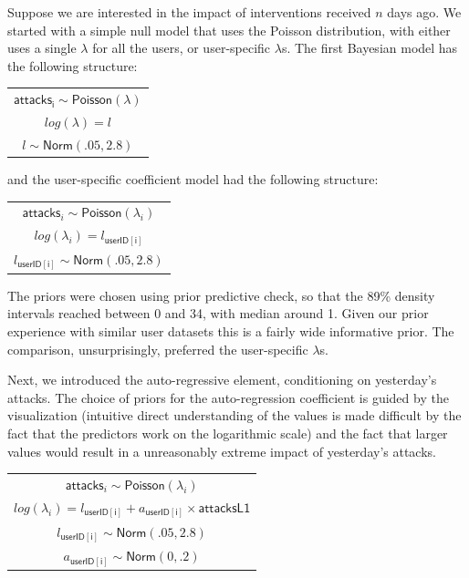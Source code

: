 \documentclass[preprint,12pt]{elsarticle}
\begin{document}
Suppose we are interested in the impact of interventions received \(n\)
days ago. We started with a simple null model that uses the Poisson
distribution, with either uses a single \(\lambda\) for all the users,
or user-specific \(\lambda\)s. The first Bayesian model has the
following structure: 


\footnotesize


\begin{center}
\begin{tabular}{c}
$\mathsf{attacks_i}  \sim  \textsf{Poisson}( \lambda)$\\$
    log(\lambda)   =  l $\\$
    l  \sim  \textsf{Norm}(.05,2.8)$
\end{tabular}
\end{center}

\normalsize

and the user-specific coefficient model had the following structure:


\footnotesize


\begin{center}
\begin{tabular}{c}
$\mathsf{attacks}_i  \sim  \textsf{Poisson}( \lambda_i)$\\$ 
    log(\lambda_i)   =  l_{\mathsf{userID[i]}} $\\$
    l_{\mathsf{userID[i]}}  \sim  \textsf{Norm}(.05,2.8)$
\end{tabular}
\end{center}


\normalsize

The priors were chosen using prior predictive check, so that the 89\%
density intervals reached between 0 and 34, with median around 1. Given
our prior experience with similar user datasets this is a fairly wide
informative prior. The comparison, unsurprisingly, preferred the
user-specific \(\lambda\)s.

Next, we introduced the auto-regressive element, conditioning on
yesterday's attacks. The choice of priors for the auto-regression
coefficient is guided by the visualization (intuitive direct
understanding of the values is made difficult by the fact that the
predictors work on the logarithmic scale) and the fact that larger
values would result in a unreasonably extreme impact of yesterday's
attacks. 



\footnotesize

\begin{center}
\begin{tabular}{c}
$\mathsf{attacks}_i  \sim  \textsf{Poisson}( \lambda_i)$\\$ 
    log(\lambda_i)   =  l_{\mathsf{userID[i]}} + a_{\mathsf{userID[i]}} \times \mathsf{attacksL1}$\\$
    l_{\mathsf{userID[i]}}  \sim  \textsf{Norm}(.05,2.8)$\\$
    a_{\mathsf{userID[i]}}  \sim \textsf{Norm}(0,.2)$
\end{tabular}
\end{center}
\end{document}
